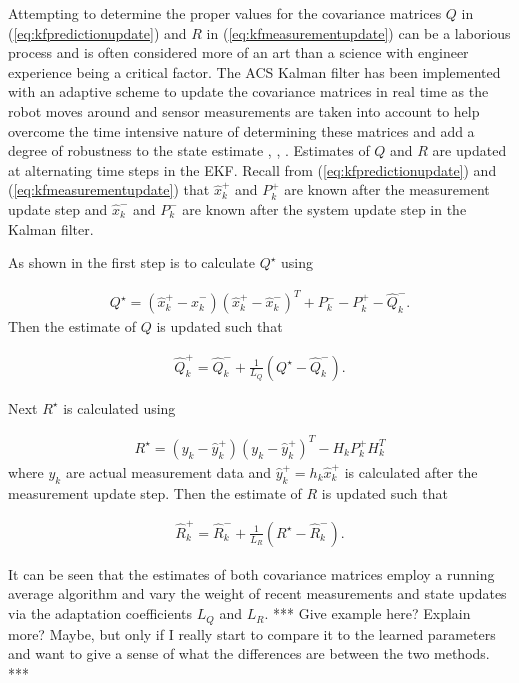 Attempting to determine the proper values for the covariance matrices $Q$ in (\ref{eq:kfpredictionupdate}) and $R$ in (\ref{eq:kfmeasurementupdate}) can be a laborious process and is often considered more of an art than a science with engineer experience being a critical factor. The ACS Kalman filter has been implemented with an adaptive scheme to update the covariance matrices in real time as the robot moves around and sensor measurements are taken into account to help overcome the time intensive nature of determining these matrices and add a degree of robustness to the state estimate \cite{Sights06}, \cite{Mehra72}, \cite{Busse03adaptiveEKF}. Estimates of $Q$ and $R$ are updated at alternating time steps in the EKF. Recall from (\ref{eq:kfpredictionupdate}) and (\ref{eq:kfmeasurementupdate}) that $\hat{x}_k^+$ and $P_k^+$ are known after the measurement update step and $\hat{x}_k^-$ and $P_k^-$ are known after the system update step in the Kalman filter.

As shown in \cite{Busse03adaptiveEKF} the first step is to calculate $Q^\star$ using

\begin{align*}
Q^\star = \left(\hat{x}_k^+-\hat{x}_k^-\right)\left(\hat{x}_k^+-\hat{x}_k^-\right)^T + P_k^- - P_k^+ - \hat{Q}_k^-.
\end{align*}
Then the estimate of $Q$ is updated such that

\begin{align}
\label{eq:qadapt}
\hat{Q}_k^+ = \hat{Q}_k^- + \frac{1}{L_Q}\left(Q^\star-\hat{Q}_k^-\right).
\end{align}

Next $R^\star$ is calculated using

\begin{align*}
R^\star = \left(y_k-\hat{y}_k^+\right)\left(y_k-\hat{y}_k^+\right)^T - H_kP_k^+H_k^T
\end{align*}
where $y_k$ are actual measurement data and $\hat{y}_k^+ = h_k\hat{x}_k^+$ is calculated after the measurement update step. Then the estimate of $R$ is updated such that

\begin{align}
\label{eq:radapt}
\hat{R}_k^+ = \hat{R}_k^- + \frac{1}{L_R}\left(R^\star-\hat{R}_k^-\right).
\end{align}

It can be seen that the estimates of both covariance matrices employ a running average algorithm and vary the weight of recent measurements and state updates via the adaptation coefficients $L_Q$ and $L_R$. *** Give example here? Explain more? Maybe, but only if I really start to compare it to the learned parameters and want to give a sense of what the differences are between the two methods. ***

